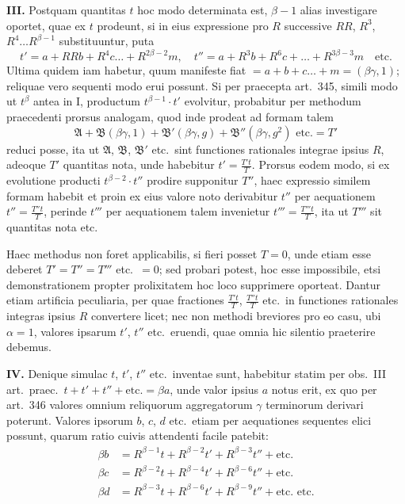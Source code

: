 \documentclass[12pt,a4paper]{article}
\theoremstyle{plain}
\theoremstyle{definition}
\theoremstyle{remark}
\begin{document}
\textbf{III.} Postquam quantitas $t$ hoc modo determinata est, $\beta - 1$ alias investigare oportet, quae ex $t$ prodeunt, si in eius expressione pro $R$ successive $RR$, $R^3$, $R^4 \ldots R^{\beta-1}$ substituuntur, puta
\[t' = a + RRb + R^4c \ldots + R^{2\beta-2}m, \quad t'' = a + R^3b + R^6c + \ldots + R^{3\beta-3}m \quad \text{etc.}\]
Ultima quidem iam habetur, quum manifeste fiat $= a + b + c \ldots + m = (\beta\gamma, 1)$; reliquae vero sequenti modo erui possunt. Si per praecepta art.\ 345, simili modo ut $t^\beta$ antea in I, productum $t^{\beta-1} \cdot t'$ evolvitur, probabitur per methodum praecedenti prorsus analogam, quod inde prodeat ad formam talem
\[\mathfrak{A} + \mathfrak{B}(\beta\gamma, 1) + \mathfrak{B}'(\beta\gamma, g) + \mathfrak{B}''(\beta\gamma, g^2) \text{ etc.} = T'\]
reduci posse, ita ut $\mathfrak{A}$, $\mathfrak{B}$, $\mathfrak{B}'$ etc.\ sint functiones rationales integrae ipsius $R$, adeoque $T'$ quantitas nota, unde habebitur $t' = \tfrac{T't}{T}$. Prorsus eodem modo, si ex evolutione producti $t^{\beta-2} \cdot t''$ prodire supponitur $T''$, haec expressio similem formam habebit et proin ex eius valore noto derivabitur $t''$ per aequationem $t'' = \tfrac{T''t}{T}$, perinde $t'''$ per aequationem talem invenietur $t''' = \tfrac{T'''t}{T}$, ita ut $T'''$ sit quantitas nota etc.

Haec methodus non foret applicabilis, si fieri posset $T = 0$, unde etiam esse deberet $T' = T'' = T'''$ etc.\ $= 0$; sed probari potest, hoc esse impossibile, etsi demonstrationem propter prolixitatem hoc loco supprimere oporteat. Dantur etiam artificia peculiaria, per quae fractiones $\tfrac{T't}{T}$, $\tfrac{T''t}{T}$ etc.\ in functiones rationales integras ipsius $R$ convertere licet; nec non methodi breviores pro eo casu, ubi $\alpha = 1$, valores ipsarum $t'$, $t''$ etc.\ eruendi, quae omnia hic silentio praeterire debemus.

\textbf{IV.} Denique simulac $t$, $t'$, $t''$ etc.\ inventae sunt, habebitur statim per obs.\ III art.\ praec.\ $t + t' + t'' + \text{etc.} = \beta a$, unde valor ipsius $a$ notus erit, ex quo per art.\ 346 valores omnium reliquorum aggregatorum $\gamma$ terminorum derivari poterunt. Valores ipsorum $b$, $c$, $d$ etc.\ etiam per aequationes sequentes elici possunt, quarum ratio cuivis attendenti facile patebit:
\begin{align*}
\beta b &= R^{\beta-1}t + R^{\beta-2}t' + R^{\beta-3}t'' + \text{etc.} \\
\beta c &= R^{\beta-2}t + R^{\beta-4}t' + R^{\beta-6}t'' + \text{etc.} \\
\beta d &= R^{\beta-3}t + R^{\beta-6}t' + R^{\beta-9}t'' + \text{etc. etc.}
\end{align*}
\end{document}
